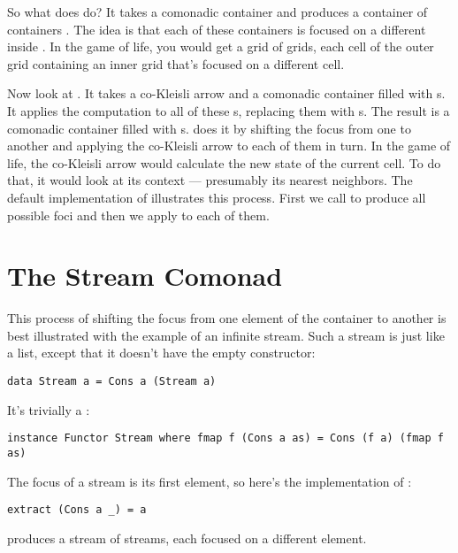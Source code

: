 So what does  do? It takes a comonadic container
 and produces a container of containers .
The idea is that each of these containers is focused on a different
 inside . In the game of life, you would get a
grid of grids, each cell of the outer grid containing an inner grid
that's focused on a different cell.

Now look at . It takes a co-Kleisli arrow and a comonadic
container  filled with s. It applies the
computation to all of these s, replacing them with
s. The result is a comonadic container filled with
s.  does it by shifting the focus from one
 to another and applying the co-Kleisli arrow to each of them
in turn. In the game of life, the co-Kleisli arrow would calculate the
new state of the current cell. To do that, it would look at its context
--- presumably its nearest neighbors. The default implementation of
 illustrates this process. First we call
 to produce all possible foci and then we apply
 to each of them.

\section{The Stream Comonad}\label{the-stream-comonad}

This process of shifting the focus from one element of the container to
another is best illustrated with the example of an infinite stream. Such
a stream is just like a list, except that it doesn't have the empty
constructor:

\begin{verbatim}
data Stream a = Cons a (Stream a)
\end{verbatim}

It's trivially a :

\begin{verbatim}
instance Functor Stream where fmap f (Cons a as) = Cons (f a) (fmap f as)
\end{verbatim}

The focus of a stream is its first element, so here's the implementation
of :

\begin{verbatim}
extract (Cons a _) = a
\end{verbatim}

 produces a stream of streams, each focused on a
different element.


